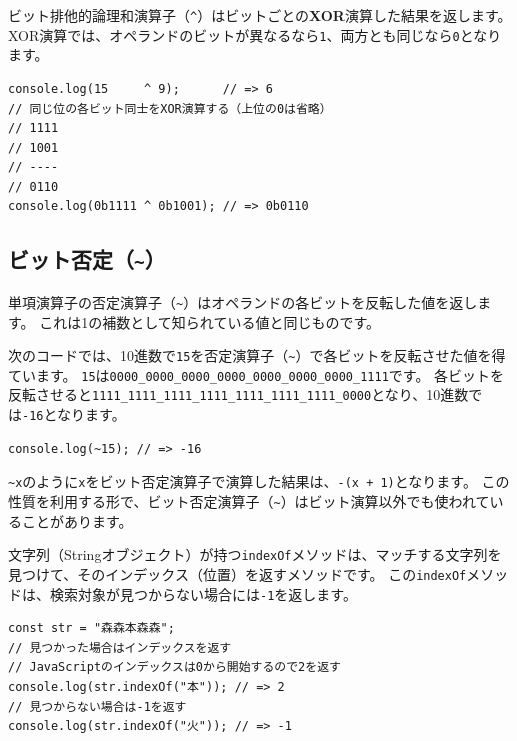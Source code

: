 ビット排他的論理和演算子（\texttt{\^{}}）はビットごとの\textbf{XOR}演算した結果を返します。
XOR演算では、オペランドのビットが異なるなら\texttt{1}、両方とも同じなら\texttt{0}となります。

\begin{lstlisting}
console.log(15     ^ 9);      // => 6
// 同じ位の各ビット同士をXOR演算する（上位の0は省略）
// 1111
// 1001
// ----
// 0110
console.log(0b1111 ^ 0b1001); // => 0b0110
\end{lstlisting}

\hypertarget{bit-not}{%
\subsection{\texorpdfstring{ビット否定（\texttt{\textasciitilde{}}）}{ビット否定（\textasciitilde{}）}}\label{bit-not}}

単項演算子の否定演算子（\lstinline{~}）はオペランドの各ビットを反転した値を返します。
これは1の補数として知られている値と同じものです。

次のコードでは、10進数で\texttt{15}を否定演算子（\lstinline{~}）で各ビットを反転させた値を得ています。
\texttt{15}は\texttt{0000\_0000\_0000\_0000\_0000\_0000\_0000\_1111}です。
各ビットを反転させると\texttt{1111\_1111\_1111\_1111\_1111\_1111\_1111\_0000}となり、10進数では\texttt{-16}となります。

\begin{lstlisting}
console.log(~15); // => -16
\end{lstlisting}

\lstinline{~x}のように\texttt{x}をビット否定演算子で演算した結果は、\lstinline{-(x + 1)}となります。
この性質を利用する形で、ビット否定演算子（\lstinline{~}）はビット演算以外でも使われていることがあります。

文字列（Stringオブジェクト）が持つ\texttt{indexOf}メソッドは、マッチする文字列を見つけて、そのインデックス（位置）を返すメソッドです。
この\texttt{indexOf}メソッドは、検索対象が見つからない場合には\texttt{-1}を返します。

\begin{lstlisting}
const str = "森森本森森";
// 見つかった場合はインデックスを返す
// JavaScriptのインデックスは0から開始するので2を返す
console.log(str.indexOf("本")); // => 2
// 見つからない場合は-1を返す
console.log(str.indexOf("火")); // => -1
\end{lstlisting}

